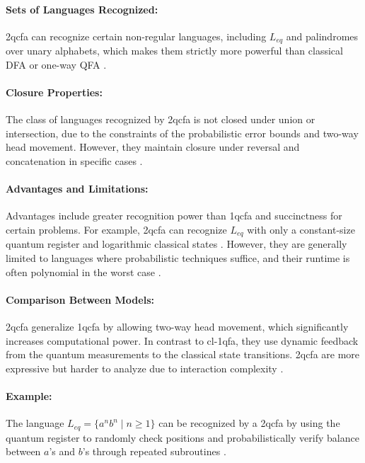 \paragraph{Sets of Languages Recognized:}  
\gls{2qcfa} can recognize certain non-regular languages, including $L_{eq}$ and palindromes over unary alphabets, which makes them strictly more powerful than classical DFA or one-way QFA \cite{ambainis2002two, li2015hybrid}.

\paragraph{Closure Properties:}  
The class of languages recognized by \gls{2qcfa} is not closed under union or intersection, due to the constraints of the probabilistic error bounds and two-way head movement. However, they maintain closure under reversal and concatenation in specific cases \cite{li2015hybrid}.

\paragraph{Advantages and Limitations:}  
Advantages include greater recognition power than \gls{1qcfa} and succinctness for certain problems. For example, \gls{2qcfa} can recognize $L_{eq}$ with only a constant-size quantum register and logarithmic classical states \cite{remscrim2020power}. However, they are generally limited to languages where probabilistic techniques suffice, and their runtime is often polynomial in the worst case \cite{remscrim2020lower}.

\paragraph{Comparison Between Models:}  
\gls{2qcfa} generalize \gls{1qcfa} by allowing two-way head movement, which significantly increases computational power. In contrast to \gls{cl-1qfa}, they use dynamic feedback from the quantum measurements to the classical state transitions. \gls{2qcfa} are more expressive but harder to analyze due to interaction complexity \cite{zheng2013state}.

\paragraph{Example:}  
The language $L_{eq} = \{ a^n b^n \mid n \geq 1 \}$ can be recognized by a \gls{2qcfa} by using the quantum register to randomly check positions and probabilistically verify balance between $a$'s and $b$'s through repeated subroutines \cite{ambainis2002two}.

